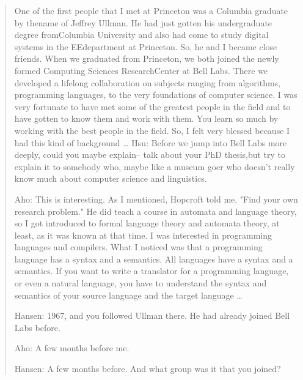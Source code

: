 \begin{quotation}
    One of the first people that I met at Princeton was a Columbia graduate by thename of Jeffrey 
Ullman. He had just gotten his undergraduate degree fromColumbia University and also had come to 
study digital systems in the EEdepartment at Princeton. So, he and I became close friends. When we 
graduated from Princeton, we both joined the newly formed Computing Sciences ResearchCenter at Bell 
Labs. There we developed a lifelong collaboration on subjects ranging from algorithms, programming 
languages, to the very foundations of computer science. I was very fortunate to have met some of the 
greatest people in the field and to have gotten to know them and work with them. You learn so much by 
working with the best people in the field. So, I felt very blessed because I had this kind of 
background
\dots
Hsu: Before we jump into Bell Labs more deeply, could you maybe explain-- talk about your PhD 
thesis,but try to explain it to somebody who, maybe like a museum goer who doesn't really know much 
about computer science and linguistics.

Aho: This is interesting. As I mentioned, Hopcroft told me, "Find your own research problem." He 
did teach a course in automata and language theory, so I got introduced to formal language theory 
and automata theory, at least, as it was known at that time. I was interested in programming 
languages and compilers. What I noticed was that a programming language has a syntax and a 
semantics. All languages have a syntax and a semantics. If you want to write a translator for a 
programming language, or even a natural language, you have to understand the syntax and semantics of 
your source language and the target language
\dots

Hansen: 1967, and you followed Ullman there. He had already joined Bell Labs before.

Aho: A few months before me.

Hansen: A few months before. And what group was it that you joined?


\end{quotation}
